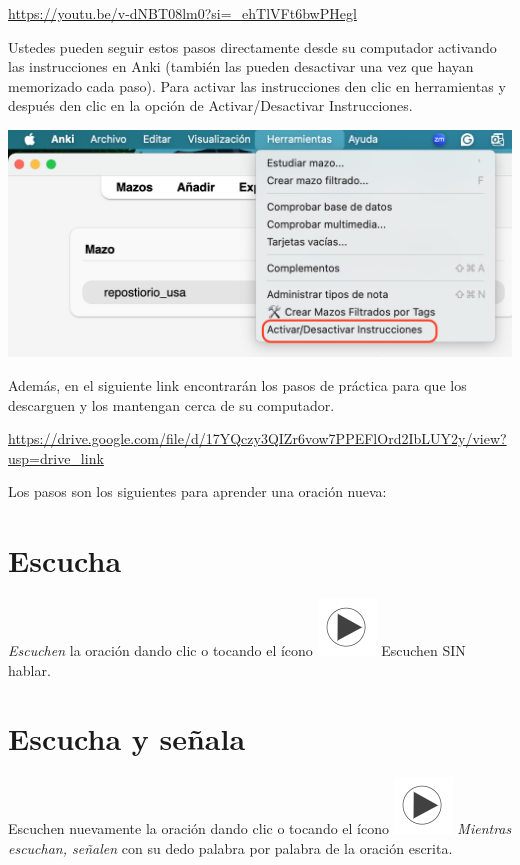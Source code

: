 \documentclass[
]{book}
\begin{document}
\url{https://youtu.be/v-dNBT08lm0?si=_ehTlVFt6bwPHegl}

Ustedes pueden seguir estos pasos directamente desde su computador activando las instrucciones en Anki (también las pueden desactivar una vez que hayan memorizado cada paso). Para activar las instrucciones den clic en herramientas y después den clic en la opción de Activar/Desactivar Instrucciones.

\includegraphics[width=0.7\linewidth]{images/reposit_sp/activar_instruc}

Además, en el siguiente link encontrarán los pasos de práctica para que los descarguen y los mantengan cerca de su computador.

\url{https://drive.google.com/file/d/17YQczy3QIZr6vow7PPEFlOrd2IbLUY2y/view?usp=drive_link}

Los pasos son los siguientes para aprender una oración nueva:

\section{Escucha}\label{cross_2}

\emph{Escuchen} la oración dando clic o tocando el ícono \includegraphics{images/play_icon.png} Escuchen SIN hablar.

\section{Escucha y señala}\label{escucha-y-seuxf1ala}

Escuchen nuevamente la oración dando clic o tocando el ícono \includegraphics{images/play_icon.png} \emph{Mientras escuchan, señalen} con su dedo palabra por palabra de la oración escrita.
\end{document}
